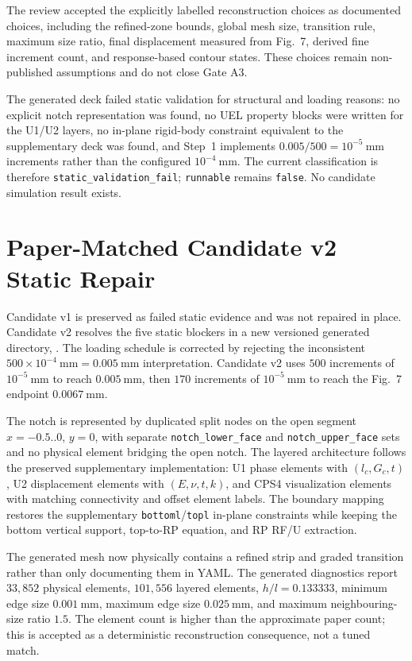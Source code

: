\documentclass[11pt,a4paper]{article}
\begin{document}
The review accepted the explicitly labelled reconstruction choices as documented choices, including the refined-zone bounds, global mesh size, transition rule, maximum size ratio, final displacement measured from Fig.~7, derived fine increment count, and response-based contour states. These choices remain non-published assumptions and do not close Gate A3.

The generated deck failed static validation for structural and loading reasons: no explicit notch representation was found, no UEL property blocks were written for the U1/U2 layers, no in-plane rigid-body constraint equivalent to the supplementary deck was found, and Step~1 implements \(0.005/500=10^{-5}\ \mathrm{mm}\) increments rather than the configured \(10^{-4}\ \mathrm{mm}\). The current classification is therefore \texttt{static\_validation\_fail}; \texttt{runnable} remains \texttt{false}. No candidate simulation result exists.

\section{Paper-Matched Candidate v2 Static Repair}

Candidate v1 is preserved as failed static evidence and was not repaired in place. Candidate v2 resolves the five static blockers in a new versioned generated directory, . The loading schedule is corrected by rejecting the inconsistent \(500\times10^{-4}\ \mathrm{mm}=0.005\ \mathrm{mm}\) interpretation. Candidate v2 uses \(500\) increments of \(10^{-5}\ \mathrm{mm}\) to reach \(0.005\ \mathrm{mm}\), then \(170\) increments of \(10^{-5}\ \mathrm{mm}\) to reach the Fig.~7 endpoint \(0.0067\ \mathrm{mm}\).

The notch is represented by duplicated split nodes on the open segment \(x=-0.5..0\), \(y=0\), with separate \texttt{notch\_lower\_face} and \texttt{notch\_upper\_face} sets and no physical element bridging the open notch. The layered architecture follows the preserved supplementary implementation: U1 phase elements with \((l_c,G_c,t)\), U2 displacement elements with \((E,\nu,t,k)\), and CPS4 visualization elements with matching connectivity and offset element labels. The boundary mapping restores the supplementary \texttt{bottoml}/\texttt{topl} in-plane constraints while keeping the bottom vertical support, top-to-RP equation, and RP RF/U extraction.

The generated mesh now physically contains a refined strip and graded transition rather than only documenting them in YAML. The generated diagnostics report \(33{,}852\) physical elements, \(101{,}556\) layered elements, \(h/l=0.133333\), minimum edge size \(0.001\ \mathrm{mm}\), maximum edge size \(0.025\ \mathrm{mm}\), and maximum neighbouring-size ratio \(1.5\). The element count is higher than the approximate paper count; this is accepted as a deterministic reconstruction consequence, not a tuned match.
\end{document}

